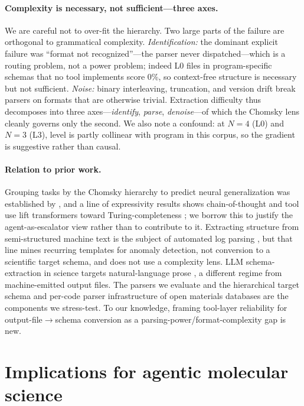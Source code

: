 \documentclass{article}
\begin{document}
\paragraph{Complexity is necessary, not sufficient---three axes.} We are careful
not to over-fit the hierarchy. Two large parts of the failure are orthogonal to
grammatical complexity. \emph{Identification:} the dominant explicit failure was
``format not recognized''---the parser never dispatched---which is a routing
problem, not a power problem; indeed L0 files in program-specific schemas that no
tool implements score 0\%, so context-free structure is necessary but not
sufficient. \emph{Noise:} binary interleaving, truncation, and version drift break
parsers on formats that are otherwise trivial. Extraction difficulty thus
decomposes into three axes---\emph{identify}, \emph{parse}, \emph{denoise}---of
which the Chomsky lens cleanly governs only the second. We also note a confound:
at $N{=}4$ (L0) and $N{=}3$ (L3), level is partly collinear with program in this
corpus, so the gradient is suggestive rather than causal.

\paragraph{Relation to prior work.} Grouping tasks by the Chomsky hierarchy to
predict neural generalization was established by \citet{deletang2023chomsky}, and a
line of expressivity results shows chain-of-thought and tool use lift transformers
toward Turing-completeness \citep{merrill2024cot,strobl2024survey}; we borrow this
to justify the agent-as-escalator view rather than to contribute to it. Extracting
structure from semi-structured machine text is the subject of automated log parsing
\citep{zhu2019logparsing}, but that line mines recurring templates for anomaly
detection, not conversion to a scientific target schema, and does not use a
complexity lens. LLM schema-extraction in science targets natural-language prose
\citep{dagdelen2024extraction}, a different regime from machine-emitted output
files. The parsers we evaluate \citep{cclib} and the hierarchical target schema
and per-code parser infrastructure of open materials databases
\citep{ghiringhelli2023metadata} are the components we stress-test. To our
knowledge, framing tool-layer reliability for output-file$\rightarrow$schema
conversion as a parsing-power/format-complexity gap is new.

\section{Implications for agentic molecular science}
\end{document}
